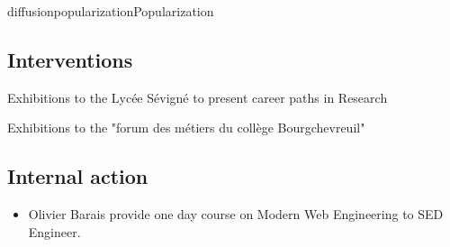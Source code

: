 \documentclass{ra2018}
\begin{document}
\begin{module}{diffusion}{popularization}{Popularization}
\subsection{Interventions}
\begin{description}
	\item Exhibitions to the Lycée Sévigné to present career paths in Research
	\item Exhibitions to the "forum des métiers du collège Bourgchevreuil"
\end{description}

\subsection{Internal action}
\begin{itemize}
\item Olivier Barais provide one day course on Modern Web Engineering to SED Engineer. 
\end{itemize}






\end{module}
\end{document}
